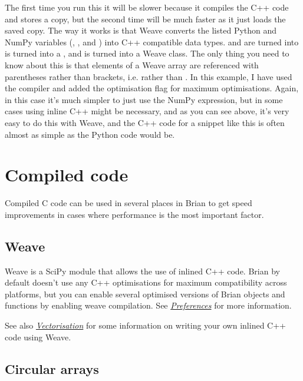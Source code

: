 \documentclass[letterpaper,10pt,english]{manual}
\begin{document}
The first time you run this it will be slower because it compiles the
C++ code and stores a copy, but the second time will be much faster as
it just loads the saved copy. The way it works is that Weave converts
the listed Python and NumPy variables (, , 
and ) into C++ compatible data types.  and
 are turned into  is turned into
a , and  is turned into a Weave
 class. The only thing you need to know about this is that
elements of a Weave array are referenced with parentheses rather than
brackets, i.e.  rather than . In
this example, I have used the  compiler and added the optimisation
flag  for maximum optimisations. Again, in this case it's much
simpler to just use the  NumPy expression,
but in some cases using inline C++ might be necessary, and as you can see
above, it's very easy to do this with Weave, and the C++ code for a
snippet like this is often almost as simple as the Python code would be.

\resetcurrentobjects
\hypertarget{--doc-compiledcode}{}

\hypertarget{compiled-code}{}\section{Compiled code}

Compiled C code can be used in several places in Brian to get speed improvements in cases where performance
is the most important factor.


\subsection{Weave}

Weave is a SciPy module that allows the use of inlined C++ code. Brian by default doesn't use any C++
optimisations for maximum compatibility across platforms, but you can enable several optimised
versions of Brian objects and functions by enabling weave compilation. See \hyperlink{preferences}{\emph{Preferences}}
for more information.

See also \hyperlink{efficiency-vectorisation}{\emph{Vectorisation}} for some information on writing your own inlined C++ code
using Weave.


\subsection{Circular arrays}
\end{document}
